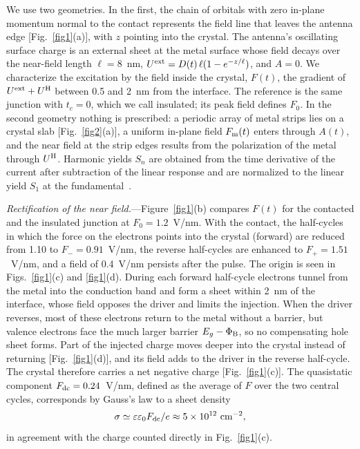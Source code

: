 \documentclass[aps,prl,twocolumn,superscriptaddress,floatfix,nolongbibliography]{revtex4-2}
\newcommand{\Fz}{F_0}
\newcommand{\Fm}{F_{\rm m}}
\newcommand{\PhiB}{\Phi_{\rm B}}
\newcommand{\Eg}{E_g}
\begin{document}
We use two geometries. In the first, the chain of orbitals with zero in-plane momentum normal
to the contact represents the field line that leaves the antenna edge
[Fig.~\ref{fig1}(a)], with $z$ pointing into the crystal. The antenna's oscillating surface
charge is an external sheet at the metal surface whose field decays over the near-field
length $\ell=8$~nm, $U^{\rm ext}=D(t)\,\ell(1-e^{-z/\ell})$, and $A=0$. We characterize the
excitation by the field inside the crystal, $F(t)$, the gradient of $U^{\rm ext}+U^{\rm H}$
between 0.5 and 2~nm from the interface. The reference is the same junction with $t_c=0$,
which we call insulated; its peak field defines $\Fz$. In the second geometry nothing is
prescribed: a periodic array of metal strips lies on a crystal slab
[Fig.~\ref{fig2}(a)], a uniform in-plane field $\Fm(t)$ enters through $A(t)$, and the near
field at the strip edges results from the polarization of the metal through $U^{\rm H}$.
Harmonic yields $S_n$ are obtained from the time derivative of the current after
subtraction of the linear response and are normalized to the linear yield $S_1$ at the
fundamental~\cite{SM}.

\textit{Rectification of the near field.}---Figure~\ref{fig1}(b) compares $F(t)$ for the
contacted and the insulated junction at $\Fz=1.2$~V/nm. With the contact, the half-cycles in which the force on the electrons points
into the crystal (forward) are reduced from 1.10 to $F_-=0.91$~V/nm, the reverse half-cycles
are enhanced to $F_+=1.51$~V/nm, and a field of 0.4~V/nm persists after the pulse. The
origin is seen in Figs.~\ref{fig1}(c) and \ref{fig1}(d). During each forward half-cycle electrons tunnel from the metal into the conduction band and
form a sheet within 2~nm of the interface, whose field opposes the driver and limits the
injection. When
the driver reverses, most of these electrons return to the metal without a barrier, but
valence electrons face the much larger barrier $\Eg-\PhiB$, so no compensating hole sheet
forms. Part of the injected charge moves deeper into the crystal instead of returning
[Fig.~\ref{fig1}(d)], and its field adds to the driver in the reverse half-cycle. The
crystal therefore carries a net negative charge
[Fig.~\ref{fig1}(c)]. The quasistatic component $F_{\rm dc}=0.24$~V/nm, defined as the average
of $F$ over the two central cycles, corresponds by Gauss's law to a sheet density
\begin{equation}
\sigma\simeq\varepsilon\varepsilon_0F_{\rm dc}/e\approx5\times10^{12}~{\rm cm}^{-2},
\label{eq:gauss}
\end{equation}
in agreement with the charge counted directly in Fig.~\ref{fig1}(c).
\end{document}

